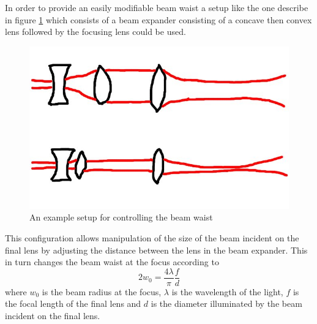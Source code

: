 In order to provide an easily modifiable beam waist a setup like the one describe in figure \ref{figs/MOT.pdf} which consists of a beam expander consisting of a concave then convex lens followed by the focusing lens could be used.

\begin{figure}[h]
	\centering
	\includegraphics[scale=0.32]{figs/waistcontrol.jpg}
	\caption[Title]{An example setup for controlling the beam waist}
	\label{figs/MOT.pdf}
\end{figure}

This configuration allows manipulation of the size of the beam incident on the final lens by adjusting the distance between the lens in the beam expander. This in turn changes the beam waist at the focus according to
\begin{equation}
2w_0=\frac{4\lambda}{\pi}\frac{f}{d}
\end{equation}
where $w_0$ is the beam radius at the focus, $\lambda$ is the wavelength of the light, $f$ is the focal length of the final lens and $d$ is the diameter illuminated by the beam incident on the final lens.



